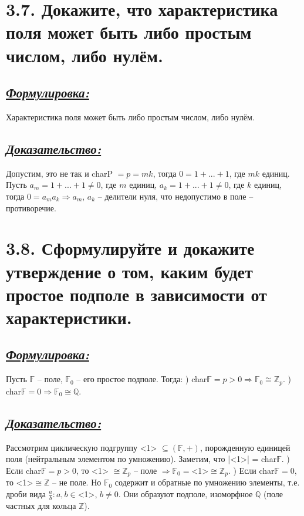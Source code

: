 \documentclass{article}
\begin{document}
\section*{\LARGE 3.7. Докажите, что характеристика поля может быть либо простым числом, либо нулём. }
\subsection*{\Large \underline{\textit{Формулировка: }}}
Характеристика поля может быть либо простым числом, либо нулём.

\subsection*{\Large \underline{\textit{Доказательство: }}}
Допустим, это не так и charP $ = p = m k$, тогда $0 = 1 + ... + 1$, где $mk$ единиц. Пусть $a_m = 1 + ... + 1 \ne 0$, где $m$ единиц, $a_k = 1 + ... + 1 \ne 0$, где $k$ единиц, тогда $0 = a_m a_k \Rightarrow a_m,\, a_k$ -- делители нуля, что недопустимо в поле -- противоречие.

\section*{\LARGE 3.8. Сформулируйте и докажите утверждение о том, каким будет простое подполе в зависимости от характеристики. }
\subsection*{\Large \underline{\textit{Формулировка: }}}
Пусть $\mathbb{F}$ -- поле, $\mathbb{F}_0$ -- его простое подполе. Тогда:
\newline{}) char$\mathbb{F} = p > 0 \Rightarrow \mathbb{F}_0 \cong \mathbb{Z}_p$. 
\newline{}) char$\mathbb{F} = 0 \Rightarrow \mathbb{F}_0 \cong \mathbb{Q}$. 

\subsection*{\Large \underline{\textit{Доказательство:}}}
Рассмотрим циклическую подгруппу <1> $\subseteq (\mathbb{F}, +)$, порожденную единицей поля (нейтральным элементом по умножению). Заметим, что |<1>| = char$\mathbb{F}$.
) Если char$\mathbb{F} = p > 0$, то <1> $\cong \mathbb{Z}_p$ -- поле $\Rightarrow \mathbb{F}_0 = $<1>$\cong \mathbb{Z}_p$.
) Если char$\mathbb{F} = 0$, то <1>$\cong \mathbb{Z}$ -- не поле. Но $\mathbb{F}_0$ содержит и обратные по умножению элементы, т.е. дроби вида $\frac{a}{b} : a,b \in$<1>, $b \ne 0$. Они образуют подполе, изоморфное $\mathbb{Q}$ (поле частных для кольца $\mathbb{Z}$).
\end{document}

